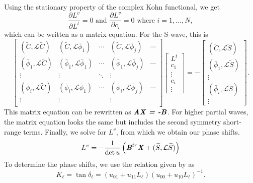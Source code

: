 \documentclass[preprint,showpacs,preprintnumbers,amsmath,amssymb]{revtex4}
\newcommand{\beq}{\begin{equation}}
\newcommand{\eeq}{\end{equation}}
\begin{document}
Using the stationary property of the complex Kohn functional, we get
\beq
\frac{\partial L^v}{\partial L^t} = 0  \text{ and } \frac{\partial L^v}{\partial c_i} = 0 \text{ where $i = 1,\ldots,N$},
\label{eq:ComplexKohnStationary}
\eeq
which can be written as a matrix equation. For the S-wave, this is
\begin{equation}
\label{eq:ComplexKohnMatrix}
\begin{bmatrix} 
 (\widetilde{C},\mathcal{L}\widetilde{C}) & (\widetilde{C},\mathcal{L}\bar{\phi}_1) & \cdots & (\widetilde{C},\mathcal{L}\bar{\phi}_j) & \cdots\\
 (\bar{\phi}_1,\mathcal{L}\widetilde{C}) & (\bar{\phi}_1,\mathcal{L}\bar{\phi}_1) & \cdots & (\bar{\phi}_1,\mathcal{L}\bar{\phi}_j) & \cdots\\
 \vdots & \vdots & \ddots & \vdots \\
 (\bar{\phi}_i,\mathcal{L}\widetilde{C}) & (\bar{\phi}_i,\mathcal{L}\bar{\phi}_1) & \cdots & (\bar{\phi}_i,\mathcal{L}\bar{\phi}_j) & \cdots\\
 \vdots & \vdots & & \vdots & \\
\end{bmatrix}
\begin{bmatrix}
L^t\\
c_1\\
\vdots\\
c_i\\
\vdots
\end{bmatrix}
= -
\begin{bmatrix}
(\widetilde{C},\mathcal{L}\widetilde{S}) \\
(\bar{\phi}_1,\mathcal{L}\widetilde{S}) \\
\vdots \\
(\bar{\phi}_i,\mathcal{L}\widetilde{S}) \\
\vdots
\end{bmatrix}.
\end{equation}
This matrix equation can be rewritten as $\textbf{\emph{AX = -B}}$. For higher partial waves, the matrix equation looks the same but includes the second symmetry short-range terms. Finally, we solve for $L^v$, from which we obtain our phase shifts.
\begin{equation}
L^v = -\frac{1}{\det u} \left( \textbf{\emph{B}}^{tr} \textbf{\emph{X}} + (\widetilde{S},\mathcal{L} \widetilde{S}) \right)
\end{equation}
To determine the phase shifts, we use the relation given by \cite{Lucchese1989} as
\begin{equation}
K_\ell = \tan \delta_\ell = (u_{01} + u_{11} L_\ell)(u_{00} + u_{10} L_\ell)^{-1}.
\end{equation}
\end{document}
